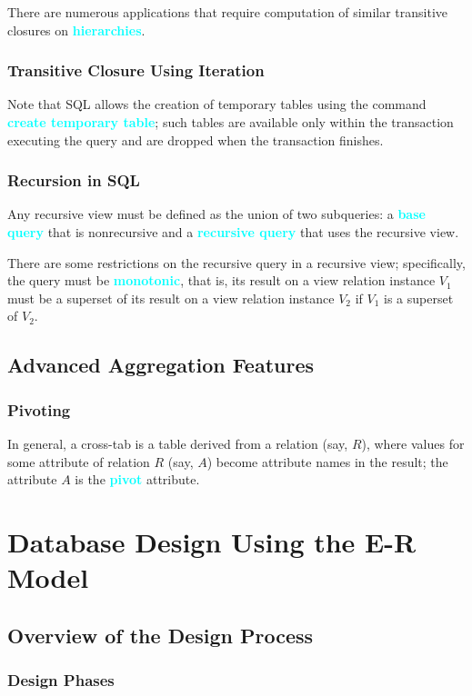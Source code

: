 \documentclass[a4paper,12pt,twoside,openany]{book}
\newcommand{\textcy}[1]{\textbf{\textcolor{cyan}{#1}}}
\begin{document}
There are numerous applications that require computation of similar transitive closures on \textcy{hierarchies}.

\subsection{Transitive Closure Using Iteration}

Note that SQL allows the creation of temporary tables using the command \textcy{create temporary table}; such tables are available only within the transaction executing the query and are dropped when the transaction finishes.

\subsection{Recursion in SQL}

Any recursive view must be defined as the union of two subqueries: a \textcy{base query} that is nonrecursive and a \textcy{recursive query} that uses the recursive view.

There are some restrictions on the recursive query in a recursive view; specifically, the query must be \textcy{monotonic}, that is, its result on a view relation instance $V_1$ must be a superset of its result on a view relation instance $V_2$ if $V_1$ is a superset of $V_2$.

\section{Advanced Aggregation Features}
\subsection{Pivoting}

In general, a cross-tab is a table derived from a relation (say, $R$), where values for some attribute of relation $R$ (say, $A$) become attribute names in the result; the attribute $A$ is the \textcy{pivot} attribute.

\chapter{Database Design Using the E-R Model}
\section{Overview of the Design Process}
\subsection{Design Phases}
\end{document}
